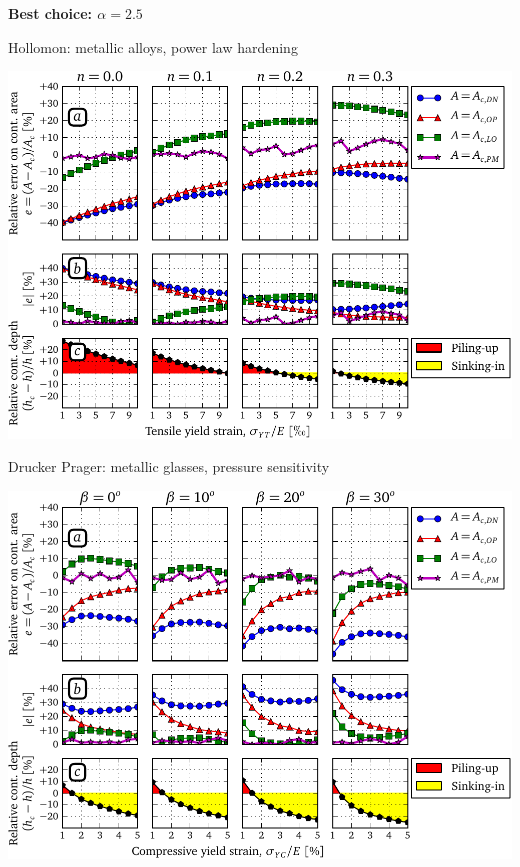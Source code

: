 \documentclass[a0paper,portrait]{baposter}
\begin{document}
\begin{poster}
{\begin{center}
{\large \textbf{Best choice: $\alpha = 2.5$\degr}}
\end{center}
}
%
%
%
%
%
%
%
{
\begin{center}
{\large Hollomon: metallic alloys, power law hardening} 
\end{center}
\begin{center}
\includegraphics[width=.83\linewidth]{figure_5}\\
\end{center}
\begin{center}
{\large Drucker Prager: metallic glasses, pressure sensitivity} 
\end{center}
\begin{center}
\includegraphics[width=.83\linewidth]{figure_6}
\end{center}
}
\end{poster}
\end{document}
